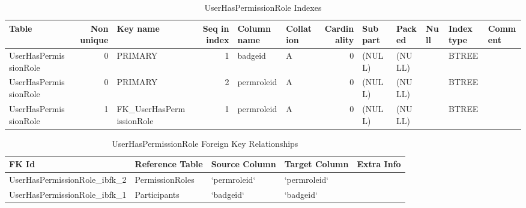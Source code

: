 \documentclass[captions=tablesignature]{scrartcl}
\begin{document}
\begin{table}[htb]
\caption{\label{tbl:userhaspermissionroleindexes}UserHasPermissionRole Indexes}
\centering
\begin{tabular}{lrlrllrlllll}
\hline
Table & Non unique & Key name & Seq in index & Column name & Collation & Cardinality & Sub part & Packed & Null & Index type & Comment\\
\hline
UserHasPermissionRole & 0 & PRIMARY & 1 & badgeid & A & 0 & (NULL) & (NULL) &  & BTREE & \\
UserHasPermissionRole & 0 & PRIMARY & 2 & permroleid & A & 0 & (NULL) & (NULL) &  & BTREE & \\
UserHasPermissionRole & 1 & FK\_UserHasPermissionRole & 1 & permroleid & A & 0 & (NULL) & (NULL) &  & BTREE & \\
\hline
\end{tabular}
\end{table}

\begin{table}[htb]
\caption{\label{tbl:UserHasPermissionrolefkr}UserHasPermissionRole Foreign Key Relationships}
\centering
\begin{tabular}{lllll}
\hline
FK Id & Reference Table & Source Column & Target Column & Extra Info\\
\hline
UserHasPermissionRole\_ibfk\_2 & PermissionRoles & `permroleid` & `permroleid` & \\
UserHasPermissionRole\_ibfk\_1 & Participants & `badgeid` & `badgeid` & \\
\hline
\end{tabular}
\end{table}
\end{document}

